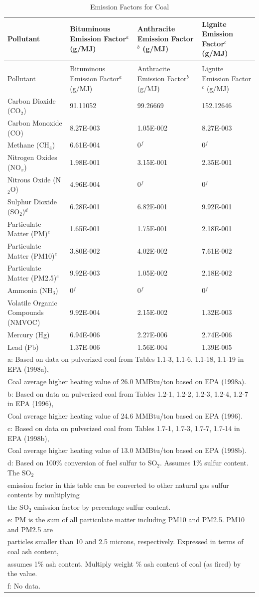 \begin{longtable}[c]{p{1.5in}p{1.5in}p{1.5in}p{1.5in}}
\caption{Emission Factors for Coal \label{table:emission-factors-for-coal}} \tabularnewline
\toprule
Pollutant & Bituminous Emission Factor\(^a\)   (g/MJ) & Anthracite Emission Factor\(^b\)   (g/MJ) & Lignite Emission Factor\(^c\)   (g/MJ) \tabularnewline
\midrule
\endfirsthead

\caption[]{Emission Factors for Coal} \tabularnewline
\toprule
Pollutant & Bituminous Emission Factor\(^a\)   (g/MJ) & Anthracite Emission Factor\(^b\)   (g/MJ) & Lignite Emission Factor\(^c\)   (g/MJ) \tabularnewline
\midrule
\endhead

Carbon Dioxide (CO\(_2\)) & 91.11052 & 99.26669 & 152.12646 \tabularnewline
Carbon Monoxide (CO) & 8.27E-003 & 1.05E-002 & 8.27E-003 \tabularnewline
Methane (CH\(_4\)) & 6.61E-004 & 0\(^f\) & 0\(^f\) \tabularnewline
Nitrogen Oxides (NO\(_x\)) & 1.98E-001 & 3.15E-001 & 2.35E-001 \tabularnewline
Nitrous Oxide (N\(_2\)O) & 4.96E-004 & 0\(^f\) & 0\(^f\) \tabularnewline
Sulphur Dioxide (SO\(_2\))\(^d\) & 6.28E-001 & 6.82E-001 & 9.92E-001 \tabularnewline
Particulate Matter (PM)\(^e\) & 1.65E-001 & 1.75E-001 & 2.18E-001 \tabularnewline
Particulate Matter (PM10)\(^e\) & 3.80E-002 & 4.02E-002 & 7.61E-002 \tabularnewline
Particulate Matter (PM2.5)\(^e\) & 9.92E-003 & 1.05E-002 & 2.18E-002 \tabularnewline
Ammonia (NH\(_3\)) & 0\(^f\) & 0\(^f\) & 0\(^f\) \tabularnewline
Volatile Organic Compounds (NMVOC) & 9.92E-004 & 2.15E-002 & 1.32E-003 \tabularnewline
Mercury (Hg) & 6.94E-006 & 2.27E-006 & 2.74E-006 \tabularnewline
Lead (Pb) & 1.37E-006 & 1.56E-004 & 1.39E-005 \tabularnewline
\midrule
\multicolumn{4}{l}{a: Based on data on pulverized coal from Tables 1.1-3, 1.1-6, 1.1-18, 1.1-19 in EPA (1998a),} \tabularnewline
\multicolumn{4}{l}{Coal average higher heating value of 26.0 MMBtu/ton based on EPA (1998a).} \tabularnewline
\multicolumn{4}{l}{b: Based on data on pulverized coal from Tables 1.2-1, 1.2-2, 1.2-3, 1.2-4, 1.2-7 in EPA (1996),} \tabularnewline
\multicolumn{4}{l}{Coal average higher heating value of 24.6 MMBtu/ton based on EPA (1996).} \tabularnewline
\multicolumn{4}{l}{c: Based on data on pulverized coal from Tables 1.7-1, 1.7-3, 1.7-7, 1.7-14 in EPA (1998b),} \tabularnewline
\multicolumn{4}{l}{Coal average higher heating value of 13.0 MMBtu/ton based on EPA (1998b).} \tabularnewline
\multicolumn{4}{l}{d: Based on 100\% conversion of fuel sulfur to SO\(_2\). Assumes 1\% sulfur content. The SO\(_2\)} \tabularnewline
\multicolumn{4}{l}{emission factor in this table can be converted to other natural gas sulfur contents by multiplying} \tabularnewline
\multicolumn{4}{l}{the SO\(_2\) emission factor by percentage sulfur content.} \tabularnewline
\multicolumn{4}{l}{e: PM is the sum of all particulate matter including PM10 and PM2.5. PM10 and PM2.5 are} \tabularnewline
\multicolumn{4}{l}{particles smaller than 10 and 2.5 microns, respectively. Expressed in terms of coal ash content,} \tabularnewline
\multicolumn{4}{l}{assumes 1\% ash content. Multiply weight \% ash content of coal (as fired) by the value.} \tabularnewline
\multicolumn{4}{l}{f: No data.} \tabularnewline
\bottomrule
\end{longtable}

